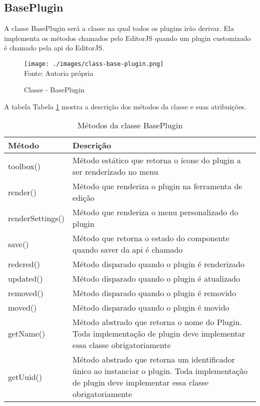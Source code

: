\subsection{BasePlugin}

A classe BasePlugin será a classe na qual todos os plugins irão derivar.
Ela implementa os métodos chamados pelo EditorJS quando um plugin customizado
é chamado pela
\acrshort{api}
do EditorJS.

\begin{figure}[H]
    \centering
    \caption{Classe - BasePlugin}
    \texttt{[image: ./images/class-base-plugin.png]}
    \label{fig:class-base-plugin} \\
    \textnormal{\fontsize{10pt}{12pt}Fonte: Autoria própria}
\end{figure}

A tabela
Tabela \ref{tbl:base-plugin-methods}
mostra a descrição dos métodos da classe e suas atribuições.

\begin{table}[H]
    \centering
    \caption{Métodos da classe BasePlugin}
    \label{tbl:base-plugin-methods}
    \renewcommand{\arraystretch}{1.5}
    \begin{tabular}{p{5.6000cm} p{10.4000cm}}
        \hline
        \textbf{Método} & \textbf{Descrição} \\
        \hline
        toolbox() & Método estático que retorna o ícone do plugin a ser renderizado no menu \\
		render() & Método que renderiza o plugin na ferramenta de edição
             \\
		renderSettings() & Método que renderiza o menu personalizado do plugin
             \\
		save() & Método que retorna o estado do componente quando saver da
                \acrshort{api}
                é chamado
             \\
		redered() & Método disparado quando o plugin é renderizado
             \\
		updated() & Método disparado quando o plugin é atualizado
             \\
		removed() & Método disparado quando o plugin é removido
             \\
		moved() & Método disparado quando o plugin é movido
             \\
		getName() & Método abstrado que retorna o nome do Plugin.
                Toda implementação de plugin deve implementar essa
                classe obrigatoriamente
             \\
		getUuid() & Método abstrado que retorna um identificador único ao instanciar o plugin.
                Toda implementação de plugin deve implementar essa
                classe obrigatoriamente
             \\
        \hline
        
    \end{tabular}
\end{table}

